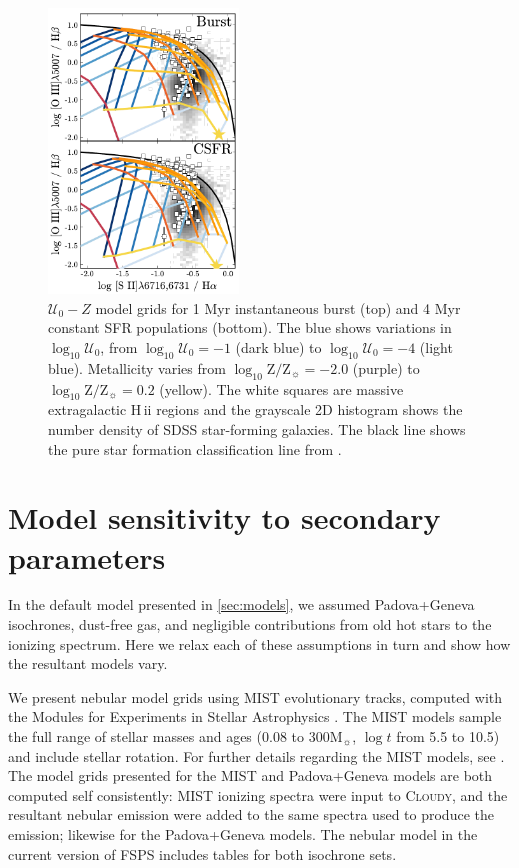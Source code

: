 \documentclass[linenumbers, trackchanges, tighten]{aastex61}%
\newcommand{\Sec}[1]{\autoref{sec:#1}}
\newcommand{\FSPS}{{\sc FSPS}\xspace}
\newcommand{\Cloudy}{\textsc{Cloudy}\xspace}
\newcommand{\logten}{\ensuremath{\log_{10}}}
\newcommand\Msun{\ensuremath{\mathrm{M_{\sun}}}}
\newcommand{\hii}{H\,{\sc ii}\xspace}
\newcommand{\logZeq}[1]{\ensuremath{\logten \mathrm{Z}/\mathrm{Z}_{\sun} = #1}}
\newcommand{\U}{\ensuremath{\mathcal{U}_{0}}}
\newcommand{\logU}{\ensuremath{\logten \mathcal{U}_0}}
\begin{document}
\begin{figure}[!htbp]
  \begin{centering}
    \includegraphics[width=0.45\textwidth]{f22.pdf}
    \caption{$\U-Z$ model grids for 1 Myr instantaneous burst (top) and 4 Myr constant SFR populations (bottom). The blue shows variations in \logU{}, from $\logU{}=-1$ (dark blue) to $\logU{}=-4$ (light blue). Metallicity varies from \logZeq{-2.0} (purple) to \logZeq{0.2} (yellow). The white squares are massive extragalactic \hii regions and the grayscale 2D histogram shows the number density of SDSS star-forming galaxies. The black line shows the pure star formation classification line from \citet{Kauffmann03a}.}
    \label{fig:alt2}
  \end{centering}
\end{figure}

\section{Model sensitivity to secondary parameters}\label{sec:secondary}

In the default model presented in \Sec{models}, we assumed Padova+Geneva isochrones, dust-free gas, and negligible contributions from old hot stars to the ionizing spectrum. Here we relax each of these assumptions in turn and show how the resultant models vary.

We present nebular model grids using MIST evolutionary tracks, computed with the Modules for Experiments in Stellar Astrophysics \citep[MESA,][]{Paxton11}. The MIST models sample the full range of stellar masses and ages (0.08 to 300\Msun{}, $\log t$ from 5.5 to 10.5) and include stellar rotation. For further details regarding the MIST models, see \citet{Choi16}. The model grids presented for the MIST and Padova+Geneva models are both computed self consistently: MIST ionizing spectra were input to \Cloudy, and the resultant nebular emission were added to the same spectra used to produce the emission; likewise for the Padova+Geneva models. The nebular model in the current version of \FSPS includes tables for both isochrone sets.
\end{document}
